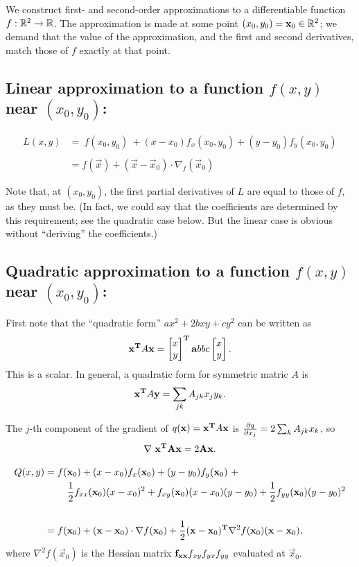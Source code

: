 \documentclass[12pt]{article}
\begin{document}
We construct first- and second-order approximations to a differentiable
function $f: \mathbb{R}^2 \rightarrow \mathbb{R}$. The approximation is made at some point
$(x_0, y_0) = \mathbf x_0 \in \mathbb{R}^2$; we demand that the value of the approximation, and the
first and second derivatives, match those of $f$ exactly at that point.

\subsection*{Linear approximation to a function $f(x, y)$ near $(x_0, y_0)$:}

\begin{align*}
L(x, y) &=
~
f(x_0, y_0) ~+
(x - x_0)f_x(x_0,y_0) +
(y - y_0)f_y(x_0,y_0)
\\\\
&= f(\vec x) + (\vec x - \vec x_0) \cdot \nabla_f(\vec x_0)
\end{align*}

Note that, at $(x_0, y_0)$, the first partial derivatives of $L$ are equal to
those of $f$, as they must be. (In fact, we could say that the coefficients are
determined by this requirement; see the quadratic case below. But the linear
case is obvious without ``deriving'' the coefficients.)


\subsection*{Quadratic approximation to a function $f(x, y)$ near $(x_0, y_0)$:}

First note that the ``quadratic form'' $ax^2 + 2bxy + cy^2$ can be written as
\begin{align*}
\mathbf x^{\mathbf{T}} A \mathbf x = \begin{bmatrix}x\\y\end{bmatrix}^{\mathbf{T}} \mathbf{a}{b}
                                {b}{c} \begin{bmatrix}x\\y\end{bmatrix}.
\end{align*}
This is a scalar. In general, a quadratic form for symmetric matric $A$ is
\begin{align*}
\mathbf x^{\mathbf{T}} A \mathbf y = \sum_{jk}A_{jk}x_jy_k.
\end{align*}

The $j$-th component of the gradient of $q(\mathbf x) = \mathbf x^{\mathbf{T}} A \mathbf x$ is
$\frac{\partial q}{\partial x_j} = 2\sum_k A_{jk}x_k$, so
\begin{align*}
  \nabla ~\mathbf x^{\mathbf{T}} \mathbf A \mathbf x = 2\mathbf A \mathbf x.
\end{align*}

\begin{align*}
Q(x, y) &=
f(\mathbf x_0) + (x - x_0)f_x(\mathbf x_0) +
(y - y_0)f_y(\mathbf x_0) ~+ \\
&~~~~~~~\frac{1}{2} f_{xx}(\mathbf x_0)(x - x_0)^2 +
f_{xy}(\mathbf x_0)(x - x_0)(y - y_0) +
\frac{1}{2} f_{yy}(\mathbf x_0)(y - y_0)^2 \\\\
&= f(\mathbf x_0) +
(\mathbf x - \mathbf x_0) \cdot \nabla f(\mathbf x_0) +
\frac{1}{2}(\mathbf x - \mathbf x_0)^{\mathbf{T}} \nabla^2 f(\mathbf x_0)(\mathbf x - \mathbf x_0),
\end{align*}
where $\nabla^2 f(\vec x_0)$ is the Hessian matrix $\mathbf{f_{xx}}{f_{xy}}
                                                        {f_{yx}}{f_{yy}}$ evaluated at $\vec x_0$.
\end{document}

